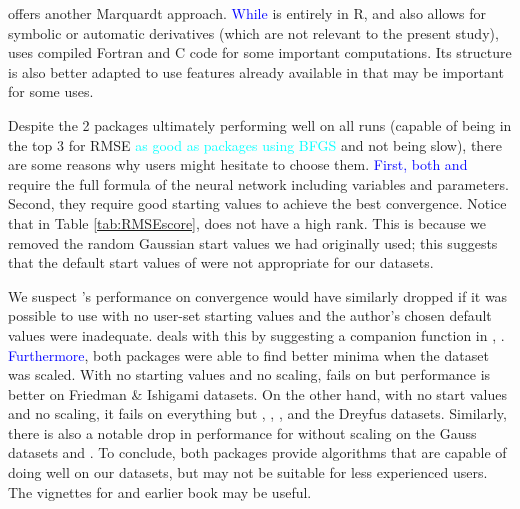  \citep{minpack.lm} offers another Marquardt approach.
\textcolor{blue}{While}  is entirely in R, and also allows for
symbolic or automatic derivatives (which are not relevant to the present
study),  uses compiled \textsf{Fortran} and \textsf{C}
code for some important computations. Its structure is also better
adapted to use features already available in  that may be
important for some uses.

Despite the 2 packages ultimately performing well on all runs (capable
of being in the top 3 for RMSE
\textcolor{cyan}{as good as packages using BFGS} and not being slow),
there are some reasons why users might hesitate to choose them.
\textcolor{blue}{First, both  and } require
the full formula of the neural network including variables and
parameters. Second, they require good starting values to achieve the
best convergence. Notice that in Table \ref{tab:RMSEscore},
 does not have a high rank. This is because we removed
the random Gaussian start values we had originally used; this suggests
that the default start values of  were not appropriate
for our datasets.

We suspect 's performance on convergence would have similarly
dropped if it was possible to use  with no user-set starting
values and the author's chosen default values were inadequate.
 deals with this by suggesting a companion function in
, . \textcolor{blue}{Furthermore}, both
packages were able to find better minima when the dataset was scaled.
With no starting values and no scaling,  fails on
 but performance is better on Friedman \& Ishigami
datasets. On the other hand, with no start values and no scaling, it
fails on everything but , ,
, and the Dreyfus datasets. Similarly, there is also a
notable drop in performance for  without scaling on the Gauss
datasets and . To conclude, both packages provide
algorithms that are capable of doing well on our datasets, but may not
be suitable for less experienced users. The vignettes for  and
earlier book \citep{Nash-nlpor14} may be useful.


